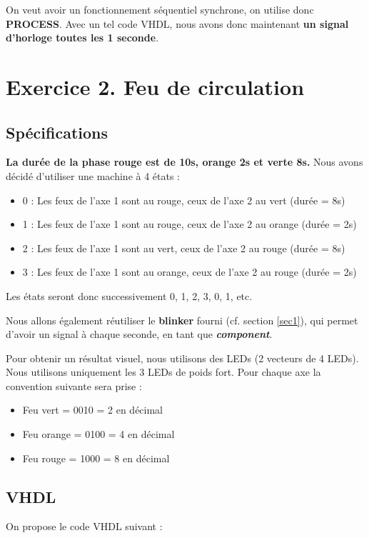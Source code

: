\noindent On veut avoir un fonctionnement séquentiel synchrone, on utilise donc \textbf{PROCESS}. Avec un tel code VHDL, nous avons donc maintenant \textbf{un signal d'horloge toutes les 1 seconde}.

\section{Exercice 2. Feu de circulation}
\subsection{Spécifications}
\noindent \textbf{La durée de la phase rouge est de 10s, orange 2s et verte 8s.} Nous avons décidé d'utiliser une machine à 4 états :
\begin{itemize}
  \item 0 : Les feux de l'axe 1 sont au rouge, ceux de l'axe 2 au vert (durée = 8s)
  \item 1 : Les feux de l'axe 1 sont au rouge, ceux de l'axe 2 au orange (durée = 2s)
  \item 2 : Les feux de l'axe 1 sont au vert, ceux de l'axe 2 au rouge (durée = 8s)
  \item 3 : Les feux de l'axe 1 sont au orange, ceux de l'axe 2 au rouge (durée = 2s)
\end{itemize}

\noindent Les états seront donc successivement 0, 1, 2, 3, 0, 1, etc.

\bigskip

Nous allons également réutiliser le \textbf{blinker} fourni (cf. section \ref{sec1}), qui permet d'avoir un signal à chaque seconde, en tant que \textit{\textbf{component}}.

\medskip

Pour obtenir un résultat visuel, nous utilisons des LEDs (2 vecteurs de 4 LEDs). Nous utilisons uniquement les 3 LEDs de poids fort. Pour chaque axe la convention suivante sera prise :
\begin{itemize}
  \item Feu vert = 0010 = 2 en décimal
  \item Feu orange = 0100 = 4 en décimal
  \item Feu rouge = 1000 = 8 en décimal
\end{itemize}
\subsection{VHDL}
\noindent On propose le code VHDL suivant :

